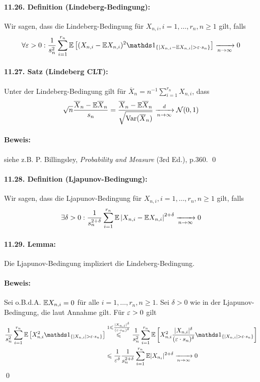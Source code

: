 \documentclass[11pt]{report}
\begin{document}
 \paragraph{11.26. Definition (Lindeberg-Bedingung):}Wir sagen, dass die Lindeberg-Bedingung für $X_{n,i},i=1,\hdots,r_n,n\geq1$ gilt, falls
 $$\forall\eps>0:\dfrac{1}{s_n^2}\sum_{i=1}^{r_n}\E\left[(X_{n,i}-\E X_{n,i})^2\ind{\{|X_{n,i}-\E X_{n,i}|>\eps\cdot s_n\}}\right]\nto{}{n\to\infty}0$$
 
 \paragraph{11.27. Satz (Lindeberg CLT):}Unter der Lindeberg-Bedingung gilt für $\overline X_n=n^{-1}\sum_{i=1}^{r_n}X_{n,i}$, dass
 $$\sqrt{n}\dfrac{\overline X_n-\E\overline X_n}{s_n}=\dfrac{\overline X_n-\E\overline X_n}{\sqrt{\Var(\overline X_n)}}\nto{d}{n\to\infty}\mathcal{N}(0,1)$$
 
 \paragraph{Beweis:}siehe z.B. P. Billingsley, \textit{Probability and Measure} (3rd Ed.), p.360. \qed
 
 \paragraph{11.28. Definition (Ljapunov-Bedingung):}Wir sagen, dass die Ljapunov-Bedingung für $X_{n,i},i=1,\hdots,r_n,n\geq1$ gilt, falls
$$\exists\delta>0:\dfrac{1}{s_n^{2+\delta}}\sum_{i=1}^{r_n}\E\left|X_{n,i}-\E X_{n,i}\right|^{2+\delta}\nto{}{n\to\infty}0$$

\paragraph{11.29. Lemma:} Die Ljapunov-Bedingung impliziert die Lindeberg-Bedingung.

\paragraph{Beweis:}Sei o.B.d.A. $\mathbb{E} X_{n,i}=0$ für alle $i=1,\hdots,r_n,n\geq1$. Sei $\delta>0$ wie in der Ljapunov-Bedingung, die laut Annahme gilt. Für $\varepsilon>0$ gilt
\begin{align*}
    \dfrac{1}{s_n^2}\sum_{i=1}^{r_n}\E\left[X_{n,i}^2\ind{\{|X_{n,i}|>\eps\cdot s_n\}}\right]&\overset{1\leq\frac{|X_{n,i}|^\delta}{(\eps\cdot s_n)^\delta}}{\leq}\dfrac{1}{s_n^2}\sum_{i=1}^{r_n}\E\left[X_{n,i}^2\dfrac{|X_{n,i}|^\delta}{(\eps\cdot s_n)^\delta}\ind{\{|X_{n,i}|>\eps\cdot s_n\}}\right]\\
    &\leq\dfrac{1}{\eps^\delta}\dfrac{1}{s_n^{2+\delta}}\sum_{i=1}^{r_n}\E|X_{n_i}|^{2+\delta}\nto{}{n\to\infty}0
\end{align*}
\qed
\end{document}
